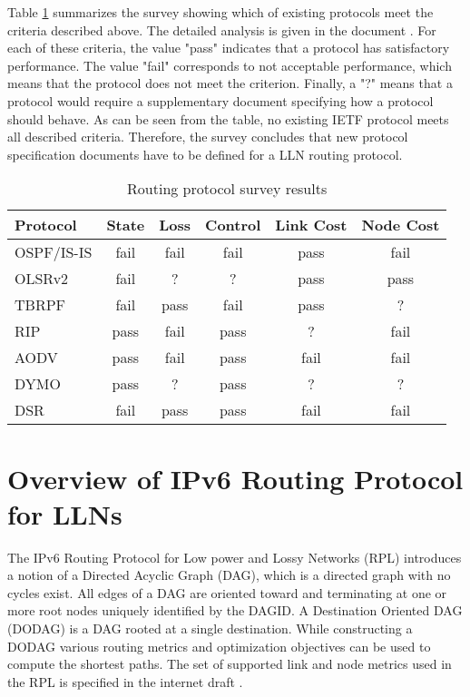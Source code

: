 Table \ref{table:routing.prot.survey} summarizes the survey showing which of existing protocols meet the criteria described above. The detailed analysis is given in the document \cite{draft-protocols-07}. For each of these criteria, the value "pass" indicates that a protocol has satisfactory performance.  The value "fail" corresponds to not acceptable performance, which means that the protocol does not meet the criterion. Finally, a "?" means that a protocol would require a supplementary document specifying how a protocol should behave. As can be seen from the table, no existing IETF protocol meets all described criteria. Therefore, the survey concludes that new protocol specification documents have to be defined for a LLN routing protocol.


\begin{table}[htp]
\begin{center}
        \begin{tabular}{|l|c|c|c|c|c|}
          \hline
          Protocol   &   State &  Loss & Control &  Link Cost & Node Cost\\
          \hline
          \hline
     OSPF/IS-IS  &  fail  &  fail  &  fail   &   pass    &   fail\\
     OLSRv2      &  fail  &   ?    &   ?     &   pass    &   pass\\
     TBRPF       &  fail  &  pass  &  fail   &   pass    &    ?\\
     RIP         &  pass  &  fail  &  pass   &    ?      &   fail\\
     AODV        &  pass  &  fail  &  pass   &   fail    &   fail\\
     DYMO        &  pass  &   ?    &  pass   &    ?      &    ?\\
     DSR         &  fail  &  pass  &  pass   &   fail    &   fail\\
          \hline
        \end{tabular}
\end{center}
\caption{Routing protocol survey results}\label{table:routing.prot.survey}
\end{table}


\section{Overview of IPv6 Routing Protocol for LLNs}\label{sec:rout.rpl}
The IPv6 Routing Protocol for Low power and Lossy Networks (RPL) introduces a notion of a Directed Acyclic Graph (DAG), which is a directed graph with no cycles exist. All edges of a DAG are oriented toward and terminating at one or more root nodes uniquely identified by the DAGID. A Destination Oriented DAG (DODAG) is a DAG rooted at a single destination. While constructing a DODAG various routing metrics and optimization objectives can be used to compute the shortest paths. The set of supported link and node metrics used in the RPL is specified in the internet draft \cite{draft-routing-metrics-04}. 

